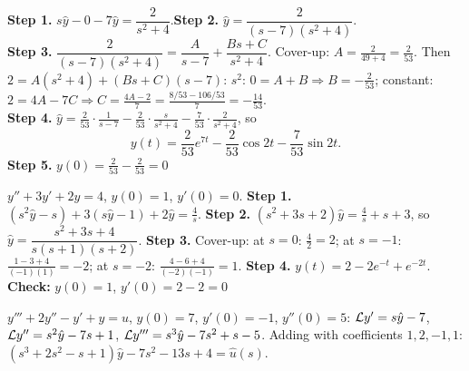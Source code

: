 \begin{workbox}[title={Worked example (AE3, A3.2): $y'-7y=\sin2t$, $y(0)=0$}]
\textbf{Step 1.} $s\hat y-0-7\hat y=\dfrac{2}{s^2+4}$.\quad \textbf{Step 2.} $\hat y=\dfrac{2}{(s-7)(s^2+4)}$.\\
\textbf{Step 3.} $\dfrac{2}{(s-7)(s^2+4)}=\dfrac{A}{s-7}+\dfrac{Bs+C}{s^2+4}$. Cover-up: $A=\frac{2}{49+4}=\frac2{53}$.
Then $2=A(s^2+4)+(Bs+C)(s-7)$: $s^2$: $0=A+B\Rightarrow B=-\frac2{53}$; constant: $2=4A-7C\Rightarrow C=\frac{4A-2}{7}=\frac{8/53-106/53}{7}=-\frac{14}{53}$.\\
\textbf{Step 4.} $\hat y=\frac2{53}\cdot\frac1{s-7}-\frac2{53}\cdot\frac{s}{s^2+4}-\frac{7}{53}\cdot\frac{2}{s^2+4}$, so
\[\boxed{y(t)=\frac{2}{53}e^{7t}-\frac{2}{53}\cos2t-\frac{7}{53}\sin2t.}\]
\textbf{Step 5.} $y(0)=\frac2{53}-\frac2{53}=0$ \checkmark
\end{workbox}

\begin{workbox}[title={Worked example: second order, step input}]
$y''+3y'+2y=4$, $y(0)=1$, $y'(0)=0$.
\textbf{Step 1.} $(s^2\hat y-s)+3(s\hat y-1)+2\hat y=\frac4s$.
\textbf{Step 2.} $(s^2+3s+2)\hat y=\frac4s+s+3$, so $\hat y=\dfrac{s^2+3s+4}{s(s+1)(s+2)}$.
\textbf{Step 3.} Cover-up: at $s=0$: $\frac{4}{2}=2$; at $s=-1$: $\frac{1-3+4}{(-1)(1)}=-2$; at $s=-2$: $\frac{4-6+4}{(-2)(-1)}=1$.
\textbf{Step 4.} $y(t)=2-2e^{-t}+e^{-2t}$. \textbf{Check:} $y(0)=1$, $y'(0)=2-2=0$ \checkmark
\end{workbox}

\begin{workbox}[title={Worked example \fr{109--110}: transform only (third order)}]
$y'''+2y''-y'+y=u$, $y(0)=7$, $y'(0)=-1$, $y''(0)=5$:
$\mathcal{L} y'=s\hat y-7$, $\mathcal{L} y''=s^2\hat y-7s+1$, $\mathcal{L} y'''=s^3\hat y-7s^2+s-5$. Adding with coefficients $1,2,-1,1$:
$(s^3+2s^2-s+1)\hat y-7s^2-13s+4=\hat u(s)$.
\end{workbox}

